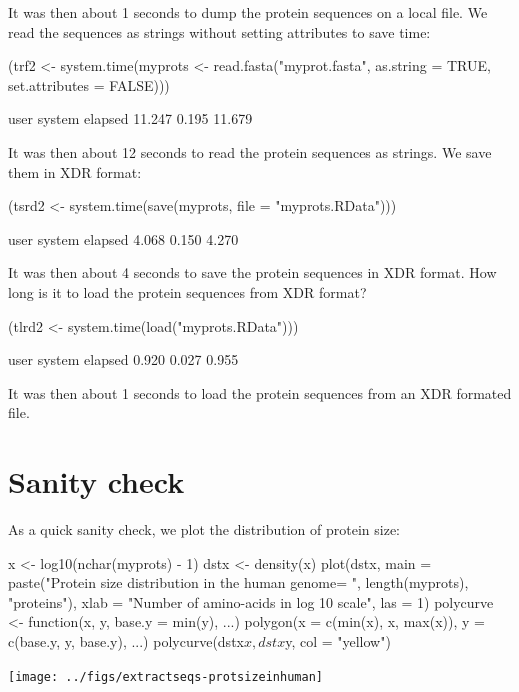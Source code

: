 \documentclass{article}
\begin{document}
It was then about 1 seconds
to dump the protein sequences on a local file. We read the sequences as strings
without setting attributes to save time:

\begin{Schunk}
\begin{Sinput}
 (trf2 <- system.time(myprots <- read.fasta("myprot.fasta", 
     as.string = TRUE, set.attributes = FALSE)))
\end{Sinput}
\begin{Soutput}
   user  system elapsed 
 11.247   0.195  11.679 
\end{Soutput}
\end{Schunk}

It was then about 12 seconds
to read the protein sequences as strings. We save them in XDR format:

\begin{Schunk}
\begin{Sinput}
 (tsrd2 <- system.time(save(myprots, file = "myprots.RData")))
\end{Sinput}
\begin{Soutput}
   user  system elapsed 
  4.068   0.150   4.270 
\end{Soutput}
\end{Schunk}

It was then about 4 seconds
to save the protein sequences in XDR format. How long is it to load the 
protein sequences from XDR format?

\begin{Schunk}
\begin{Sinput}
 (tlrd2 <- system.time(load("myprots.RData")))
\end{Sinput}
\begin{Soutput}
   user  system elapsed 
  0.920   0.027   0.955 
\end{Soutput}
\end{Schunk}

It was then about 1 seconds
to load the protein sequences from an XDR formated file.

\section{Sanity check}

As a quick sanity check, we plot the distribution of protein size:


\begin{Schunk}
\begin{Sinput}
 x <- log10(nchar(myprots) - 1)
 dstx <- density(x)
 plot(dstx, main = paste("Protein size distribution in the human genome\nn = ", 
     length(myprots), "proteins"), xlab = "Number of amino-acids in log 10 scale", 
     las = 1)
 polycurve <- function(x, y, base.y = min(y), ...) polygon(x = c(min(x), 
     x, max(x)), y = c(base.y, y, base.y), ...)
 polycurve(dstx$x, dstx$y, col = "yellow")
\end{Sinput}
\end{Schunk}
\texttt{[image: ../figs/extractseqs-protsizeinhuman]}
\end{document}
